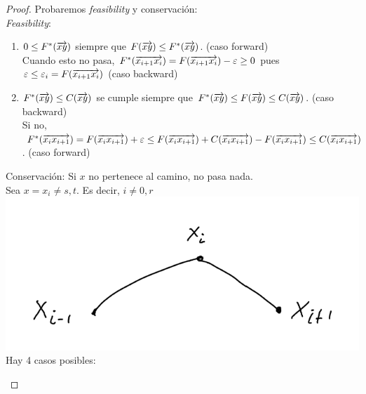 \begin{proof}
Probaremos \textit{feasibility} y conservación:\\
\textit{Feasibility}: 
\begin{enumerate} 
\item $0 \le F^{*}(\overrightarrow{xy})$ siempre que $F(\overrightarrow{xy}) \le F^{*}(\overrightarrow{xy})$. (caso forward)\\
Cuando esto no pasa,  $F^{*}(\overrightarrow{x_{i+1} x_i}) = F(\overrightarrow{x_{i+1} x_i}) - \varepsilon \ge 0$ pues $\varepsilon \le \varepsilon_{i} = F(\overrightarrow{x_{i+1} x_i})$ (caso backward)
\item $F^{*}(\overrightarrow{xy}) \le C(\overrightarrow{xy})$ se cumple siempre que $F^{*}(\overrightarrow{xy}) \le F(\overrightarrow{xy}) \le C(\overrightarrow{xy})$. (caso backward) \\
Si no, $F^*(\overrightarrow{x_i x_{i+1}}) = F(\overrightarrow{x_i x_{i+1}}) + \varepsilon \le F(\overrightarrow{x_i x_{i+1}}) + C(\overrightarrow{x_i x_{i+1}})- F(\overrightarrow{x_i x_{i+1}}) \le C(\overrightarrow{x_i x_{i+1}})$.  (caso forward)
\end{enumerate}
Conservación:
Si $x$ no pertenece al camino, no pasa nada.\\
Sea $x= x_i \neq s, t$. Es decir, $i \neq 0, r$\\

\includegraphics[scale=0.4]{img/base.png}\\
Hay 4 casos posibles:
\begin{enumerate}


\end{enumerate}
\end{proof}
